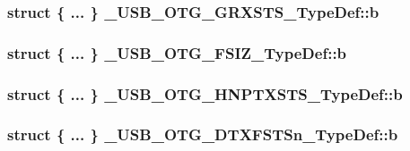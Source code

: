 \hypertarget{group___u_s_b___o_t_g___d_r_i_v_e_r_gad746c43da68af26662793c5c15a5c0a1}{
\subsubsection[{b}]{\setlength{\rightskip}{0pt plus 5cm}struct \{ ... \} 
   \-\_\-\-U\-S\-B\-\_\-\-O\-T\-G\-\_\-\-G\-R\-X\-S\-T\-S\-\_\-\-Type\-Def\-::b}}\label{group___u_s_b___o_t_g___d_r_i_v_e_r_gad746c43da68af26662793c5c15a5c0a1}
\hypertarget{group___u_s_b___o_t_g___d_r_i_v_e_r_gaa74e396b6f09634d2daa7550b339cbaa}{
\subsubsection[{b}]{\setlength{\rightskip}{0pt plus 5cm}struct \{ ... \} 
   \-\_\-\-U\-S\-B\-\_\-\-O\-T\-G\-\_\-\-F\-S\-I\-Z\-\_\-\-Type\-Def\-::b}}\label{group___u_s_b___o_t_g___d_r_i_v_e_r_gaa74e396b6f09634d2daa7550b339cbaa}
\hypertarget{group___u_s_b___o_t_g___d_r_i_v_e_r_ga93b03184bf8fd8e9db0d50ef51e02aa3}{
\subsubsection[{b}]{\setlength{\rightskip}{0pt plus 5cm}struct \{ ... \} 
   \-\_\-\-U\-S\-B\-\_\-\-O\-T\-G\-\_\-\-H\-N\-P\-T\-X\-S\-T\-S\-\_\-\-Type\-Def\-::b}}\label{group___u_s_b___o_t_g___d_r_i_v_e_r_ga93b03184bf8fd8e9db0d50ef51e02aa3}
\hypertarget{group___u_s_b___o_t_g___d_r_i_v_e_r_ga72a3d9f86c27e387f27aaa1b1b5dc7cb}{
\subsubsection[{b}]{\setlength{\rightskip}{0pt plus 5cm}struct \{ ... \} 
   \-\_\-\-U\-S\-B\-\_\-\-O\-T\-G\-\_\-\-D\-T\-X\-F\-S\-T\-Sn\-\_\-\-Type\-Def\-::b}}\label{group___u_s_b___o_t_g___d_r_i_v_e_r_ga72a3d9f86c27e387f27aaa1b1b5dc7cb}
